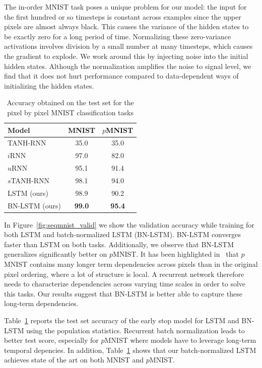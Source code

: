 \documentclass{article} %
\begin{document}
The in-order MNIST task poses a unique problem for our model:
the input for the first hundred or so timesteps is constant across examples since the upper pixels are almost always black.
This causes the variance of the hidden states to be exactly zero for a long period of time.
Normalizing these zero-variance activations involves division by a small number at many timesteps, which causes the gradient to explode.
We work around this by injecting noise into the initial hidden states.
Although the normalization amplifies the noise to signal level, we find that it does not hurt performance compared to data-dependent ways of initializing the hidden states.


\begin{table}
\center
\begin{tabular}{@{}lcc@{}}
  \toprule
  \bf Model & \bf MNIST & \bf $p$MNIST \\
  \midrule
  TANH-RNN~\cite{le2015simple} & 35.0 & 35.0\\
  $i$RNN~\cite{le2015simple} & 97.0 & 82.0\\
  $u$RNN~\cite{urnn} & 95.1 & 91.4\\
  $s$TANH-RNN~\cite{zhang2016architectural} & 98.1 & 94.0\\
  \midrule
  LSTM (ours) & 98.9 & 90.2\\
  BN-LSTM (ours) & \textbf{99.0} & \textbf{95.4}\\
  \bottomrule
\end{tabular}
\caption{Accuracy obtained on the test set for the pixel by pixel MNIST classification tasks}
\label{tab:seqmnist_test}

\end{table}

In Figure~\ref{fig:seqmnist_valid} we show the validation accuracy while training for both LSTM and batch-normalized LSTM (BN-LSTM).
BN-LSTM converges faster than LSTM on both tasks.
Additionally, we observe that BN-LSTM generalizes significantly better on $p$MNIST.
It has been highlighted in~\cite{urnn} that
$p$MNIST contains many longer term dependencies across pixels than in
the original pixel ordering, where a lot of structure is local.
A recurrent network therefore needs to characterize dependencies across varying time scales in order to solve this tasks.
Our results suggest that BN-LSTM is better able to capture these long-term dependencies.

Table~\ref{tab:seqmnist_test} reports the test set accuracy of the early stop model for LSTM and BN-LSTM using the population statistics.
Recurrent batch normalization leads to better test score, especially for $p$MNIST where models have to leverage long-term temporal depencies.
In addition, Table~\ref{tab:seqmnist_test} shows that our batch-normalized LSTM achieves state of the art on both MNIST and $p$MNIST.
\end{document}
